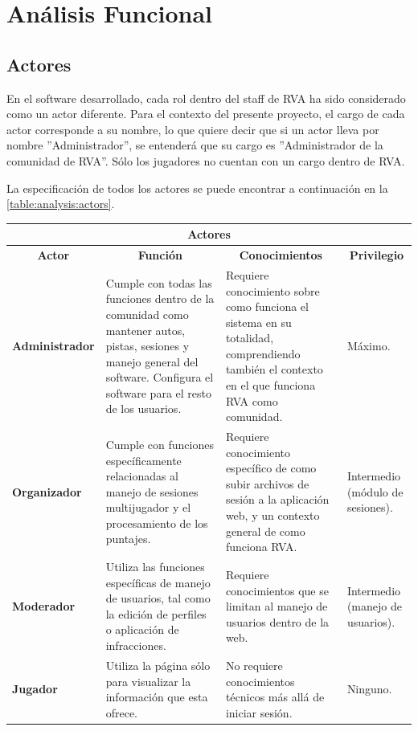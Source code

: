 \chapter{Análisis Funcional}

\section{Actores}
\label{analysis:actors}
En el software desarrollado, cada rol dentro del staff de RVA ha sido considerado como un actor diferente. Para el contexto del presente proyecto, el cargo de cada actor corresponde a su nombre, lo que quiere decir que si un actor lleva por nombre ''Administrador'', se entenderá que su cargo es ''Administrador de la comunidad de RVA''. Sólo los jugadores no cuentan con un cargo dentro de RVA.

La especificación de todos los actores se puede encontrar a continuación en la \autoref{table:analysis:actors}.

\begin{center}
  \begin{tabular}{| p{3cm} | p{4.5cm} | p{4.5cm} | p{2cm} |}
    \hline
    \multicolumn{4}{|c|}{\textbf{Actores}} \\
    \hline
    \multicolumn{1}{|c|}{\textbf{Actor}} & \multicolumn{1}{|c|}{\textbf{Función}} & \multicolumn{1}{|c|}{\textbf{Conocimientos}} & \multicolumn{1}{|c|}{\textbf{Privilegio}}\\
    \hline
    {\textbf{Administrador}} & Cumple con todas las funciones dentro de la comunidad como mantener autos, pistas, sesiones y manejo general del software. Configura el software para el resto de los usuarios. & Requiere conocimiento sobre como funciona el sistema en su totalidad, comprendiendo también el contexto en el que funciona RVA como comunidad. & Máximo. \\ \hline
    {\textbf{Organizador}} & Cumple con funciones específicamente relacionadas al manejo de sesiones multijugador y el procesamiento de los puntajes. & Requiere conocimiento específico de como subir archivos de sesión a la aplicación web, y un contexto general de como funciona RVA. & Intermedio (módulo de sesiones).\\ \hline
    {\textbf{Moderador}} & Utiliza las funciones específicas de manejo de usuarios, tal como la edición de perfiles o aplicación de infracciones. & Requiere conocimientos que se limitan al manejo de usuarios dentro de la web. & Intermedio (manejo de usuarios).\\ \hline
    {\textbf{Jugador}} & Utiliza la página sólo para visualizar la información que esta ofrece. & No requiere conocimientos técnicos más allá de iniciar sesión. & Ninguno.\\ \hline
  \end{tabular}
  \label{table:analysis:actors}
\end{center}

